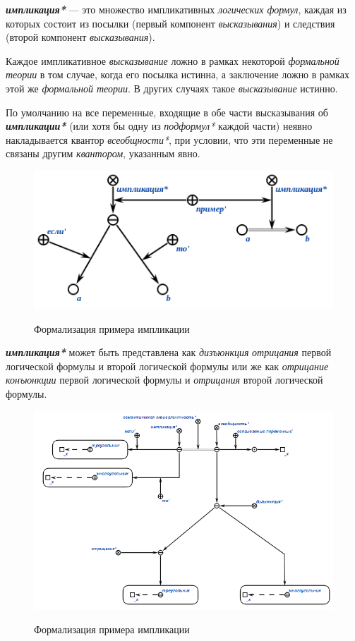\textbf{\textit{импликация*}} --- это множество импликативных \textit{логических формул}, каждая из которых состоит из посылки (первый компонент \textit{высказывания}) и следствия (второй компонент \textit{высказывания}).

Каждое импликативное \textit{высказывание} ложно в рамках некоторой \textit{формальной теории} в том случае, когда его посылка истинна, а заключение ложно в рамках этой же \textit{формальной теории}. В других случаях такое \textit{высказывание} истинно.

По умолчанию на все переменные, входящие в обе части высказывания об \textbf{\textit{импликации*}} (или хотя бы одну из \textit{подформул*} каждой части) неявно накладывается квантор \textit{всеобщности*}, при условии, что эти переменные не связаны другим \textit{квантором}, указанным явно.

\begin{figure}[H]
\caption{Формализация примера импликации}
\includegraphics[scale=0.8]{author/part2/figures/logic/implication.png}
\label{fig:implication}
\end{figure}

\textbf{\textit{импликация*}} может быть представлена как \textit{дизъюнкция} \textit{отрицания} первой логической формулы и второй логической формулы или же как \textit{отрицание} \textit{конъюнкции} первой логической формулы и \textit{отрицания} второй логической формулы.

\begin{figure}[H]
	\caption{Формализация примера импликации}
	\includegraphics[scale=0.8]{author/part2/figures/logic/implication_representation.png}
	\label{fig:implication_representation}
\end{figure}

